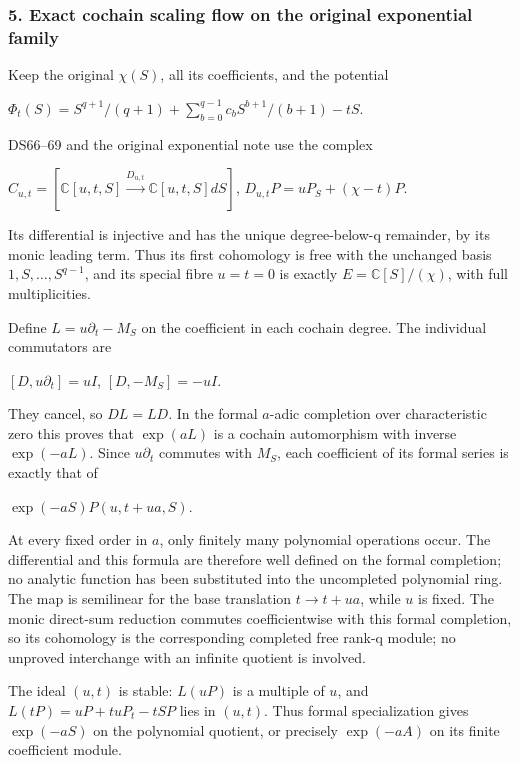 \documentclass{article}
\begin{document}
\subsubsection{5. Exact cochain scaling flow on the original exponential family}\label{endpoint-f1_scaling--exact-cochain-scaling-flow-on-the-original-exponential-family}

Keep the original \(\chi(S)\), all its coefficients, and the potential

\(\Phi_t(S)=S^{q+1}/(q+1)+\sum_{b=0}^{q-1} c_b S^{b+1}/(b+1)-tS\).

DS66--69 and the original exponential note use the complex

\(C_{u,t}=[\mathbb C[u,t,S]\xrightarrow{D_{u,t}}\mathbb C[u,t,S]dS]\), \(D_{u,t}P=u P_S+(\chi-t)P\).

Its differential is injective and has the unique degree-below-q remainder, by its monic leading term. Thus its first cohomology is free with the unchanged basis \(1,S,\ldots,S^{q-1}\), and its special fibre \(u=t=0\) is exactly \(E=\mathbb C[S]/(\chi)\), with full multiplicities.

Define \(L=u \partial_t-M_S\) on the coefficient in each cochain degree. The individual commutators are

\([D,u \partial_t]=u I\), \([D,-M_S]=-u I\).

They cancel, so \(D L=L D\). In the formal \(a\)-adic completion over characteristic zero this proves that \(\exp(aL)\) is a cochain automorphism with inverse \(\exp(-aL)\). Since \(u \partial_t\) commutes with \(M_S\), each coefficient of its formal series is exactly that of

\(\exp(-aS)P(u,t+ua,S)\).

At every fixed order in \(a\), only finitely many polynomial operations occur. The differential and this formula are therefore well defined on the formal completion; no analytic function has been substituted into the uncompleted polynomial ring. The map is semilinear for the base translation \(t\to t+ua\), while \(u\) is fixed. The monic direct-sum reduction commutes coefficientwise with this formal completion, so its cohomology is the corresponding completed free rank-q module; no unproved interchange with an infinite quotient is involved.

The ideal \((u,t)\) is stable: \(L(uP)\) is a multiple of \(u\), and \(L(tP)=uP+tu P_t-tSP\) lies in \((u,t)\). Thus formal specialization gives \(\exp(-aS)\) on the polynomial quotient, or precisely \(\exp(-aA)\) on its finite coefficient module.
\end{document}
